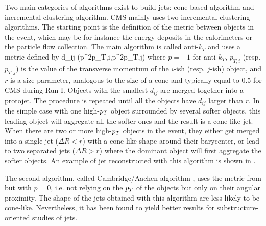     Two main categories of algorithms exist to build jets: cone-based algorithm
    and incremental clustering algorithm. CMS mainly uses two incremental
    clustering algorithms. The starting point is the definition of the metric
    between objects in the event, which may be for instance the energy deposits
    in the calorimeters or the particle flow collection. The main algorithm is
    called anti-$k_T$ \cite{antiKt} and uses a metric defined by
    {
        d_{ij}  {}(p^{2p}_{T,i},p^{2p}_{T,j}) 
    }
    where $p = -1$ for anti-$k_T$, $p_{T,i}$ (resp. $p_{T,j}$) is the value of
    the transverse momentum of the $i$-ish (resp. $j$-ish) object, and $r$ is a
    size parameter, analogous to the size of a cone and typically equal to 0.5
    for CMS during Run I. Objects with the smallest $d_{ij}$ are merged together
    into a protojet. The procedure is repeated until all the objects have
    $d_{ij}$ larger than $r$. In the simple case with one high-$p_T$ object
    surrounded by several softer objects, this leading object will aggregate all
    the softer ones and the result is a cone-like jet. When there are two or
    more high-$p_T$ objects in the event, they either get merged into a single
    jet ($\Delta R < r$) with a cone-like shape around their barycenter, or lead
    to two separated jets ($\Delta R > r$) where the dominant object will first
    aggregate the softer objects. An example of jet reconstructed with this
    algorithm is shown in .

    The second algorithm, called Cambridge/Aachen algorithm \cite{CA}, uses the
    metric from  but with $p = 0$, i.e. not
    relying on the $p_T$ of the objects but only on their angular proximity. The
    shape of the jets obtained with this algorithm are less likely to be
    cone-like. Nevertheless, it has been found to yield better results for
    substructure-oriented studies of jets.


